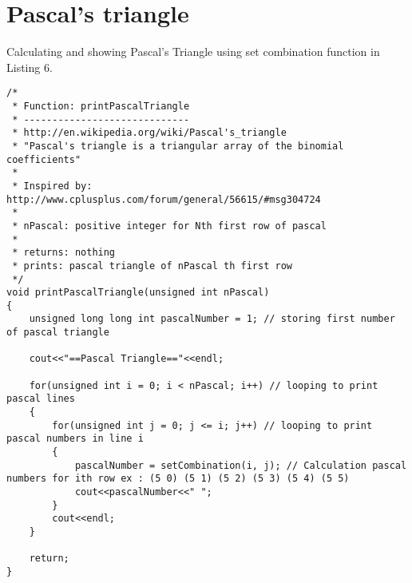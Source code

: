 \documentclass{article}
\begin{document}
\section{Pascal’s triangle}
Calculating and showing Pascal's Triangle using set combination function in Listing 6. 

		\begin{lstlisting}[label=pascal-triangle,caption=Pascal Triangle]	
/*
 * Function: printPascalTriangle
 * -----------------------------
 * http://en.wikipedia.org/wiki/Pascal's_triangle
 * "Pascal's triangle is a triangular array of the binomial coefficients"
 *
 * Inspired by: http://www.cplusplus.com/forum/general/56615/#msg304724
 *
 * nPascal: positive integer for Nth first row of pascal
 *
 * returns: nothing
 * prints: pascal triangle of nPascal th first row
 */
void printPascalTriangle(unsigned int nPascal)
{
    unsigned long long int pascalNumber = 1; // storing first number of pascal triangle
    
    cout<<"==Pascal Triangle=="<<endl;
    
    for(unsigned int i = 0; i < nPascal; i++) // looping to print pascal lines
    {
        for(unsigned int j = 0; j <= i; j++) // looping to print pascal numbers in line i
        {
            pascalNumber = setCombination(i, j); // Calculation pascal numbers for ith row ex : (5 0) (5 1) (5 2) (5 3) (5 4) (5 5)
            cout<<pascalNumber<<" ";
        }
        cout<<endl;
    }
    
    return;
}
		\end{lstlisting}
\end{document}
